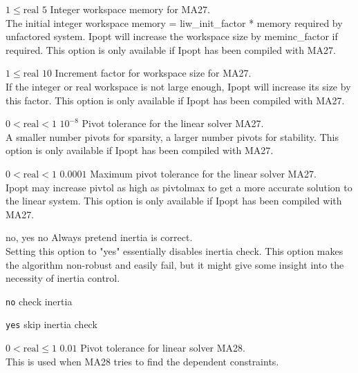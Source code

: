 %
{$1\leq\textrm{real}$}%
{$5$}%
{Integer workspace memory for MA27.\\
The initial integer workspace memory = liw\_init\_factor * memory required by unfactored system. Ipopt will increase the workspace size by meminc\_factor if required.  This option is only available if Ipopt has been compiled with MA27.}%
{}

%
{$1\leq\textrm{real}$}%
{$10$}%
{Increment factor for workspace size for MA27.\\
If the integer or real workspace is not large enough, Ipopt will increase its size by this factor.  This option is only available if Ipopt has been compiled with MA27.}%
{}

%
{$0<\textrm{real}<1$}%
{$10^{- 8}$}%
{Pivot tolerance for the linear solver MA27.\\
A smaller number pivots for sparsity, a larger number pivots for stability.  This option is only available if Ipopt has been compiled with MA27.}%
{}

%
{$0<\textrm{real}<1$}%
{$0.0001$}%
{Maximum pivot tolerance for the linear solver MA27.\\
Ipopt may increase pivtol as high as pivtolmax to get a more accurate solution to the linear system.  This option is only available if Ipopt has been compiled with MA27.}%
{}

%
{\ttfamily no, yes}%
{no}%
{Always pretend inertia is correct.\\
Setting this option to "yes" essentially disables inertia check. This option makes the algorithm non-robust and easily fail, but it might give some insight into the necessity of inertia control.}%
{\begin{list}{}{
\setlength{\parsep}{0em}
\setlength{\leftmargin}{5ex}
\setlength{\labelwidth}{2ex}
\setlength{\itemindent}{0ex}
\setlength{\topsep}{0pt}}
\item[\texttt{no}] check inertia
\item[\texttt{yes}] skip inertia check
\end{list}
}

%
{$0<\textrm{real}\leq1$}%
{$0.01$}%
{Pivot tolerance for linear solver MA28.\\
This is used when MA28 tries to find the dependent constraints.}%
{}

